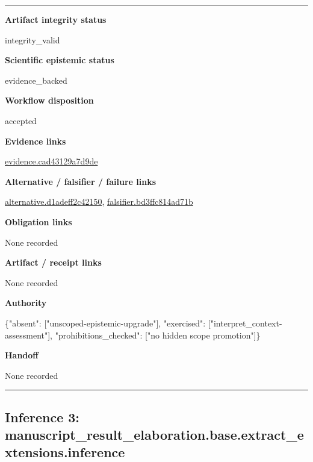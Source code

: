 \documentclass[10pt,a4paper]{article}
\newcommand{\TraceField}[2]{\par\noindent\textbf{#1}\par\noindent #2\par\smallskip}
\newenvironment{TraceDossier}{\par\medskip\noindent\hrule\medskip}{\medskip\hrule\par\medskip}
\begin{document}
\begin{TraceDossier}
\TraceField{Artifact integrity status}{integrity\_\allowbreak{}valid}

\TraceField{Scientific epistemic status}{evidence\_\allowbreak{}backed}

\TraceField{Workflow disposition}{accepted}

\TraceField{Evidence links}{\hyperlink{trace-evidence-8bcc9b6a728d6c85e2}{evidence.\allowbreak{}cad43129a7\allowbreak{}d9de}}

\TraceField{Alternative / falsifier / failure links}{\hyperlink{trace-alternative-fe0e968b205a8c0669}{alternativ\allowbreak{}e.\allowbreak{}d1adeff2c4\allowbreak{}2150}, \hyperlink{trace-alternative-8de3333d711a6f0c80}{falsifier.\allowbreak{}bd3ffc814a\allowbreak{}d71b}}

\TraceField{Obligation links}{None recorded}

\TraceField{Artifact / receipt links}{None recorded}

\TraceField{Authority}{\{"absent":\allowbreak{} ["unscoped\allowbreak{}-\allowbreak{}epistemic-\allowbreak{}upgrade"],\allowbreak{} "exercised\allowbreak{}":\allowbreak{} ["interpre\allowbreak{}t\_\allowbreak{}context-\allowbreak{}assessment\allowbreak{}"], "prohibiti\allowbreak{}ons\_\allowbreak{}checked":\allowbreak{} ["no hidden scope promotion"\allowbreak{}]\}}

\TraceField{Handoff}{None recorded}

\end{TraceDossier}
\pagebreak[2]\subsection{Inference 3: manuscript\allowbreak{}\_\allowbreak{}result\_\allowbreak{}elaboratio\allowbreak{}n.\allowbreak{}base.\allowbreak{}extract\_\allowbreak{}extensions\allowbreak{}.\allowbreak{}inference}\label{trace-inference-1eab0f132df2c441b0}
\end{document}
